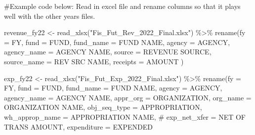 \documentclass[
  letterpaper,
  DIV=11,
  numbers=noendperiod]{scrreport}
\newenvironment{Shaded}{\begin{snugshade}}{\end{snugshade}}
\newcommand{\AttributeTok}[1]{\textcolor[rgb]{0.40,0.45,0.13}{#1}}
\newcommand{\CommentTok}[1]{\textcolor[rgb]{0.37,0.37,0.37}{#1}}
\newcommand{\FunctionTok}[1]{\textcolor[rgb]{0.28,0.35,0.67}{#1}}
\newcommand{\NormalTok}[1]{\textcolor[rgb]{0.00,0.23,0.31}{#1}}
\newcommand{\OtherTok}[1]{\textcolor[rgb]{0.00,0.23,0.31}{#1}}
\newcommand{\SpecialCharTok}[1]{\textcolor[rgb]{0.37,0.37,0.37}{#1}}
\newcommand{\StringTok}[1]{\textcolor[rgb]{0.13,0.47,0.30}{#1}}
\begin{document}
\begin{Shaded}
\begin{Highlighting}[]
\CommentTok{\#Example code below: Read in excel file and rename columns so that it plays well with the other years\textquotesingle{} files.}

\NormalTok{revenue\_fy22 }\OtherTok{\textless{}{-}} \FunctionTok{read\_xlsx}\NormalTok{(}\StringTok{"Fis\_Fut\_Rev\_2022\_Final.xlsx"}\NormalTok{) }\SpecialCharTok{\%\textgreater{}\%} 
  \FunctionTok{rename}\NormalTok{(}\AttributeTok{fy =} \StringTok{\textquotesingle{}FY\textquotesingle{}}\NormalTok{,}
         \AttributeTok{fund =} \StringTok{\textquotesingle{}FUND\textquotesingle{}}\NormalTok{,}
         \AttributeTok{fund\_name =} \StringTok{\textquotesingle{}FUND NAME\textquotesingle{}}\NormalTok{,}
         \AttributeTok{agency =} \StringTok{\textquotesingle{}AGENCY\textquotesingle{}}\NormalTok{,}
         \AttributeTok{agency\_name =} \StringTok{\textquotesingle{}AGENCY NAME\textquotesingle{}}\NormalTok{,}
         \AttributeTok{source =} \StringTok{\textquotesingle{}REVENUE SOURCE\textquotesingle{}}\NormalTok{,}
         \AttributeTok{source\_name =} \StringTok{\textquotesingle{}REV SRC NAME\textquotesingle{}}\NormalTok{,}
         \AttributeTok{receipts =} \StringTok{\textquotesingle{}AMOUNT\textquotesingle{}}
\NormalTok{  ) }

\NormalTok{exp\_fy22 }\OtherTok{\textless{}{-}} \FunctionTok{read\_xlsx}\NormalTok{(}\StringTok{"Fis\_Fut\_Exp\_2022\_Final.xlsx"}\NormalTok{) }\SpecialCharTok{\%\textgreater{}\%} 
  \FunctionTok{rename}\NormalTok{(}\AttributeTok{fy =} \StringTok{\textquotesingle{}FY\textquotesingle{}}\NormalTok{,}
         \AttributeTok{fund =} \StringTok{\textquotesingle{}FUND\textquotesingle{}}\NormalTok{,}
         \AttributeTok{fund\_name =} \StringTok{\textquotesingle{}FUND NAME\textquotesingle{}}\NormalTok{,}
         \AttributeTok{agency =} \StringTok{\textquotesingle{}AGENCY\textquotesingle{}}\NormalTok{,}
         \AttributeTok{agency\_name =} \StringTok{\textquotesingle{}AGENCY NAME\textquotesingle{}}\NormalTok{,}
         \AttributeTok{appr\_org =} \StringTok{\textquotesingle{}ORGANIZATION\textquotesingle{}}\NormalTok{,}
         \AttributeTok{org\_name =} \StringTok{\textquotesingle{}ORGANIZATION NAME\textquotesingle{}}\NormalTok{,}
         \AttributeTok{obj\_seq\_type =} \StringTok{\textquotesingle{}APPROPRIATION\textquotesingle{}}\NormalTok{,}
         \AttributeTok{wh\_approp\_name =} \StringTok{\textquotesingle{}APPROPRIATION NAME\textquotesingle{}}\NormalTok{,}
        \CommentTok{\# exp\_net\_xfer = \textquotesingle{}NET OF TRANS AMOUNT\textquotesingle{},}
         \AttributeTok{expenditure =} \StringTok{\textquotesingle{}EXPENDED\textquotesingle{}}


\end{Highlighting}
\end{Shaded}
\end{document}
